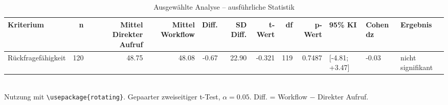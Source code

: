 \begin{table}
\centering
\caption{Ausgewählte Analyse -- ausführliche Statistik}
\begin{tabular}{lrrrrrrrrlll}
\toprule
Kriterium & n & Mittel Direkter Aufruf & Mittel Workflow & Diff. & SD Diff. & t-Wert & df & p-Wert & 95\% KI & Cohen dz & Ergebnis \\
\midrule
Rückfragefähigkeit & 120 & 48.75 & 48.08 & -0.67 & 22.90 & -0.321 & 119 & 0.7487 & [-4.81; +3.47] & -0.03 & nicht signifikant \\
\bottomrule
\end{tabular}
\\[2mm]
\footnotesize Nutzung mit \texttt{\textbackslash usepackage\{rotating\}}. Gepaarter zweiseitiger t-Test, $\alpha=0.05$. Diff. = Workflow $-$ Direkter Aufruf.
\end{table}
